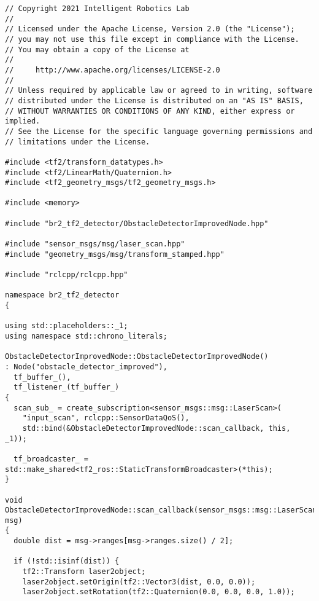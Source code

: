  \footnotesize
\begin{tcolorbox}[sharp corners, colframe=gray!80, colback=LightGray, left=0pt, top=0pt, bottom=0pt, title=\texttt{br2\_tf2\_detector/src/br2\_tf2\_detector/ObstacleDetectorImprovedNode.cpp}]
  \begin{verbatim}
// Copyright 2021 Intelligent Robotics Lab
//
// Licensed under the Apache License, Version 2.0 (the "License");
// you may not use this file except in compliance with the License.
// You may obtain a copy of the License at
//
//     http://www.apache.org/licenses/LICENSE-2.0
//
// Unless required by applicable law or agreed to in writing, software
// distributed under the License is distributed on an "AS IS" BASIS,
// WITHOUT WARRANTIES OR CONDITIONS OF ANY KIND, either express or implied.
// See the License for the specific language governing permissions and
// limitations under the License.

#include <tf2/transform_datatypes.h>
#include <tf2/LinearMath/Quaternion.h>
#include <tf2_geometry_msgs/tf2_geometry_msgs.h>

#include <memory>

#include "br2_tf2_detector/ObstacleDetectorImprovedNode.hpp"

#include "sensor_msgs/msg/laser_scan.hpp"
#include "geometry_msgs/msg/transform_stamped.hpp"

#include "rclcpp/rclcpp.hpp"

namespace br2_tf2_detector
{

using std::placeholders::_1;
using namespace std::chrono_literals;

ObstacleDetectorImprovedNode::ObstacleDetectorImprovedNode()
: Node("obstacle_detector_improved"),
  tf_buffer_(),
  tf_listener_(tf_buffer_)
{
  scan_sub_ = create_subscription<sensor_msgs::msg::LaserScan>(
    "input_scan", rclcpp::SensorDataQoS(),
    std::bind(&ObstacleDetectorImprovedNode::scan_callback, this, _1));

  tf_broadcaster_ = std::make_shared<tf2_ros::StaticTransformBroadcaster>(*this);
}

void
ObstacleDetectorImprovedNode::scan_callback(sensor_msgs::msg::LaserScan::UniquePtr msg)
{
  double dist = msg->ranges[msg->ranges.size() / 2];

  if (!std::isinf(dist)) {
    tf2::Transform laser2object;
    laser2object.setOrigin(tf2::Vector3(dist, 0.0, 0.0));
    laser2object.setRotation(tf2::Quaternion(0.0, 0.0, 0.0, 1.0));


\end{verbatim}
\end{tcolorbox}
